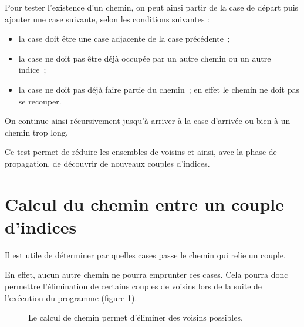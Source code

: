 Pour tester l'existence d'un chemin, on peut ainsi partir de la case de départ puis ajouter une case suivante, selon les conditions suivantes : 
\begin{itemize}
\item la case doit être une case adjacente de la case précédente\ ;
\item la case ne doit pas  être déjà occupée par un autre chemin ou un autre indice\ ;
\item la case ne doit pas déjà faire partie du chemin\ ; en effet le chemin ne doit pas se recouper.
\end{itemize}
On continue ainsi récursivement jusqu'à arriver à la case d'arrivée ou bien à un chemin trop long.

Ce test permet de réduire les ensembles de voisins et ainsi, avec la phase de propagation, de découvrir de nouveaux couples d'indices.

\section{Calcul du chemin entre un couple d'indices}

Il est utile de déterminer par quelles cases passe le chemin qui relie un couple.

En effet, aucun autre chemin ne pourra emprunter ces cases. Cela pourra donc permettre l'élimination de certains couples de voisins lors de la suite de l'exécution du programme (figure \ref{calcul-chemin}).
\begin{figure}[h]
  \centering  
 \hspace {1cm}
  \caption{Le calcul de chemin permet d'éliminer des voisins possibles.}
  \label{calcul-chemin}
\end{figure}


